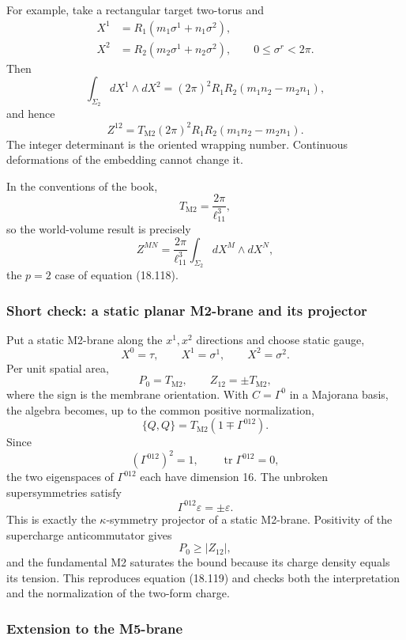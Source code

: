 \documentclass[
  10pt,
  a4paper,
  openany]{book}
\begin{document}
For example, take a rectangular target two-torus and \[
\begin{aligned}
X^1&=R_1(m_1\sigma^1+n_1\sigma^2),\\
X^2&=R_2(m_2\sigma^1+n_2\sigma^2),
\qquad
0\leq\sigma^r<2\pi.
\end{aligned}
\] Then \[
\int_{\Sigma_2}dX^1\wedge dX^2
=(2\pi)^2R_1R_2(m_1n_2-m_2n_1),
\] and hence \[
Z^{12}
=T_{\mathrm{M2}}(2\pi)^2R_1R_2
(m_1n_2-m_2n_1).
\] The integer determinant is the oriented wrapping number. Continuous
deformations of the embedding cannot change it.

In the conventions of the book, \[
T_{\mathrm{M2}}=\frac{2\pi}{\ell_{11}^3},
\] so the world-volume result is precisely \[
\boxed{
Z^{MN}
=\frac{2\pi}{\ell_{11}^3}
\int_{\Sigma_2}dX^M\wedge dX^N
},
\] the \(p=2\) case of equation (18.118).

\subsubsection{Short check: a static planar M2-brane and its
projector}\label{short-check-a-static-planar-m2-brane-and-its-projector}

Put a static M2-brane along the \(x^1,x^2\) directions and choose static
gauge, \[
X^0=\tau,
\qquad
X^1=\sigma^1,
\qquad
X^2=\sigma^2.
\] Per unit spatial area, \[
P_0=T_{\mathrm{M2}},
\qquad
Z_{12}=\pm T_{\mathrm{M2}},
\] where the sign is the membrane orientation. With \(C=\Gamma^0\) in a
Majorana basis, the algebra becomes, up to the common positive
normalization, \[
\{Q,Q\}
=T_{\mathrm{M2}}
\left(1\mp\Gamma^{012}\right).
\] Since \[
(\Gamma^{012})^2=1,
\qquad
\operatorname{tr}\Gamma^{012}=0,
\] the two eigenspaces of \(\Gamma^{012}\) each have dimension 16. The
unbroken supersymmetries satisfy \[
\boxed{
\Gamma^{012}\varepsilon=\pm\varepsilon
}.
\] This is exactly the \(\kappa\)-symmetry projector of a static
M2-brane. Positivity of the supercharge anticommutator gives \[
P_0\geq |Z_{12}|,
\] and the fundamental M2 saturates the bound because its charge density
equals its tension. This reproduces equation (18.119) and checks both
the interpretation and the normalization of the two-form charge.

\subsubsection{Extension to the
M5-brane}\label{extension-to-the-m5-brane}
\end{document}
